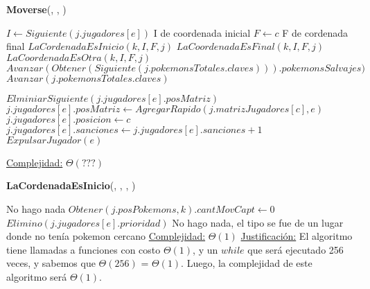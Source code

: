 \begin{algorithm}[H]{\textbf{Moverse}(, , )}
    \begin{algorithmic}[1]
        \State $I \gets Siguiente(j.jugadores[e])$ \Comment I de coordenada inicial
        \State $F \gets c$  \Comment F de cordenada final
                   \State $LaCordenadaEsInicio(k, I, F, j)$
                   \State $LaCoordenadaEsFinal(k, I, F, j)$
                   \State $LaCoordenadaEsOtra(k, I, F, j)$
                \State$Avanzar(Obtener(Siguiente(j.pokemonsTotales.claves))).pokemonsSalvajes)$
                \EndWhile
        \State $Avanzar(j.pokemonsTotales.claves)$
     \EndWhile
        
        \State $ElminiarSiguiente(j.jugadores[e].posMatriz)$
        \State $j.jugadores[e].posMatriz \gets AgregarRapido(j.matrizJugadores[c], e)$
        \State $j.jugadores[e].posicion \gets c$
            \State $j.jugadores[e].sanciones \gets j.jugadores[e].sanciones + 1$
        \EndIf
            \State $ExpulsarJugador(e)$
        \EndIf

        \Statex \underline{Complejidad:} $\Theta(???)$
    \end{algorithmic}
\end{algorithm}

\begin{algorithm}[H]{\textbf{LaCordenadaEsInicio}(, , , )}   
    \begin{algorithmic}[1]
                                \State \Comment No hago nada
                            \Else
                                \State $Obtener(j.posPokemons, k).cantMovCapt \gets 0$
                                \State $Elimino(j.jugadores[e].prioridad)$
                            \EndIf
                        \Else
\State \Comment No hago nada, el tipo se fue de un lugar donde no tenía pokemon cercano
                        \EndIf
                    \EndIf
                \EndIf
                \medskip
        \Statex \underline{Complejidad:} $\Theta(1)$
        \Statex \underline{Justificación:}  El algoritmo tiene llamadas a funciones con costo $\Theta(1)$, y un $while$ que será ejecutado 256 veces, y sabemos que $\Theta (256)$ = $\Theta (1)$. Luego, la complejidad de este algoritmo será $\Theta (1)$.
    \end{algorithmic}
\end{algorithm} 

